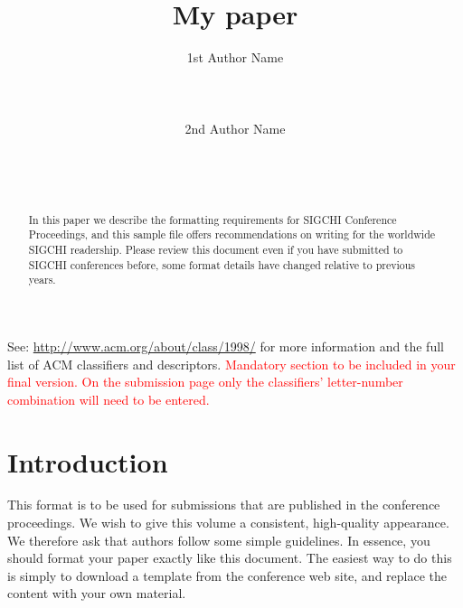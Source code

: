 \documentclass{sigchi}
\begin{document}
\title{My paper}

\author{
  \alignauthor 1st Author Name\\
    \\
    \\
    \\
  \alignauthor 2nd Author Name\\
    \\
    \\
    \\
}

\maketitle

\begin{abstract}
In this paper we describe the formatting requirements for
SIGCHI Conference Proceedings, and this sample file
offers recommendations on writing for the worldwide
SIGCHI readership. Please review this document even if
you have submitted to SIGCHI conferences before, some
format details have changed relative to previous years.
\end{abstract}



See: \url{http://www.acm.org/about/class/1998/}
for more information and the full list of ACM classifiers
and descriptors. 
\textcolor{red}{Mandatory section to be included in your
final version. On the submission page only the classifiers'
letter-number combination will need to be entered.}

\section{Introduction}

This format is to be used for submissions that are
published in the conference proceedings.  We wish to give
this volume a consistent, high-quality appearance. We
therefore ask that authors follow some simple
guidelines. In essence, you should format your paper
exactly like this document. The easiest way to do this is
simply to download a template from the conference web
site, and replace the content with your own material.
\end{document}
